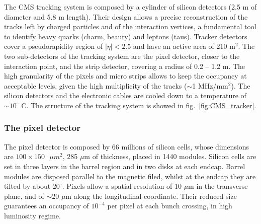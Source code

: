 The CMS tracking system is composed by a cylinder of silicon detectors (2.5 m of diameter and 5.8 m length). Their design allows a precise reconstruction of the tracks left by charged particles and of the interaction vertices, a fundamental tool to identify heavy quarks (charm, beauty) and leptons (taus).
Tracker detectors cover a pseudorapidity region of $|\eta|<2.5$ and have an active area of $210\text{ m}^2$. The two sub-detectors of the tracking system are the pixel detector, closer to the interaction point, and the strip detector, covering a radius of 0.2 -- 1.2 m. The high granularity of the pixels and micro strips allows to keep the occupancy at acceptable levels, given the high multiplicity of the tracks ($\sim$1 MHz/$\text{mm}^2$). The silicon detectors and the electronic cables are cooled down to a temperature of $\sim 10^{\circ}$ C. The structure of the tracking system is showed in fig.~\ref{fig:CMS_tracker}.

\subsubsection{The pixel detector}
The pixel detector is composed by 66 millions of silicon cells, whose dimensions are $100 \times 150 \text{ }{\mu{m}}^2$, 285 $\mu$m of thickness, placed in 1440 modules. Silicon cells are set in three layers in the barrel region and in two disks at each endcap. Barrel modules are disposed parallel to the magnetic filed, whilst at the endcap they are tilted by about $20^{\circ}$. 
Pixels allow a spatial resolution of 10 $\mu$m in the transverse plane, and of $\sim$20 $\mu$m along the longitudinal coordinate. Their reduced size guarantees an occupancy of $10^{-4}$ per pixel at each bunch crossing, in high luminosity regime.

